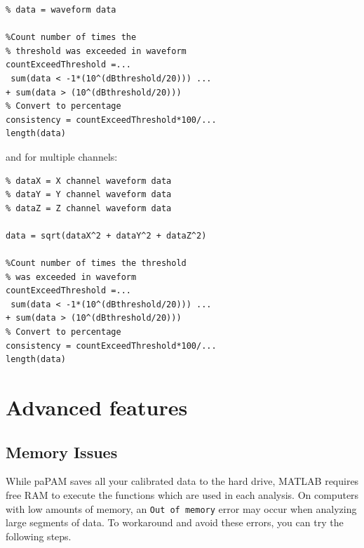 \documentclass[11pt]{report}
\begin{document}
\begin{itemize}
\begin{lstlisting}
% data = waveform data

%Count number of times the
% threshold was exceeded in waveform
countExceedThreshold =...
 sum(data < -1*(10^(dBthreshold/20))) ...
+ sum(data > (10^(dBthreshold/20)))
% Convert to percentage
consistency = countExceedThreshold*100/...
length(data)
\end{lstlisting}

and for multiple channels:
\begin{lstlisting}
% dataX = X channel waveform data
% dataY = Y channel waveform data
% dataZ = Z channel waveform data

data = sqrt(dataX^2 + dataY^2 + dataZ^2)

%Count number of times the threshold
% was exceeded in waveform
countExceedThreshold =...
 sum(data < -1*(10^(dBthreshold/20))) ...
+ sum(data > (10^(dBthreshold/20)))
% Convert to percentage
consistency = countExceedThreshold*100/...
length(data)
\end{lstlisting}

\end{itemize}

\chapter{Advanced features}
\section{Memory Issues} \label{MemoryIssues}

While paPAM saves all your calibrated data to the hard drive, MATLAB requires free RAM to execute the functions which are used in each analysis.  On computers with low amounts of memory, an \texttt{Out of memory} error may occur when analyzing large segments of data.  To workaround and avoid these errors, you can try the following steps.
\end{document}
